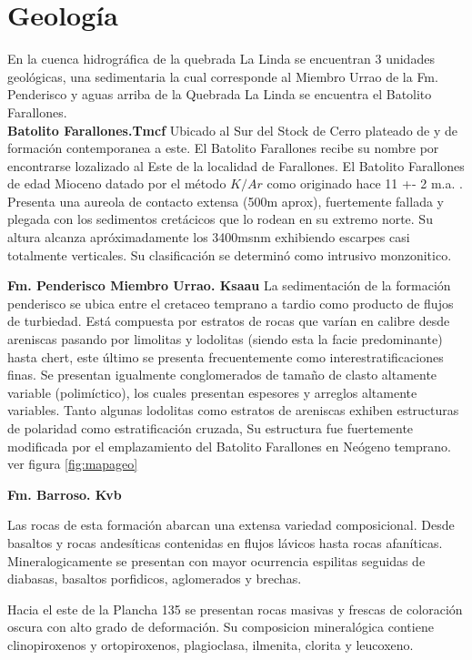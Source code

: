 \section{Geolog\'ia}
En la cuenca hidrogr\'afica de la quebrada La Linda se encuentran 3 unidades geol\'ogicas, una sedimentaria la cual corresponde al Miembro Urrao de la Fm. Penderisco y aguas arriba de la Quebrada La Linda se encuentra el Batolito Farallones.\\

\textbf{Batolito Farallones.Tmcf}
Ubicado al Sur del Stock de Cerro plateado de y de formaci\'on contemporanea a este. El Batolito Farallones recibe su nombre por encontrarse lozalizado al Este de la localidad de Farallones.
El Batolito Farallones de edad Mioceno datado por el m\'etodo $K/Ar$ como originado hace 11 +- 2 m.a. \cite{farallones}. Presenta una aureola de contacto extensa (500m aprox), fuertemente fallada y plegada con los sedimentos cret\'acicos que lo rodean en su extremo norte. Su altura alcanza apr\'oximadamente los 3400msnm exhibiendo escarpes casi totalmente verticales.
Su clasificaci\'on se determin\'o como intrusivo monzonitico.
 

\textbf{Fm. Penderisco Miembro Urrao. Ksaau}
La sedimentaci\'on de la formaci\'on penderisco se ubica entre el cretaceo temprano a tardio como producto de flujos de turbiedad.
Est\'a compuesta por estratos de rocas que var\'ian en calibre desde areniscas pasando por limolitas y lodolitas (siendo esta la facie predominante) hasta chert, este \'ultimo se presenta frecuentemente como interestratificaciones finas. Se presentan igualmente conglomerados de tama\~no de clasto altamente variable (polim\'ictico), los cuales presentan espesores y arreglos altamente variables.
Tanto algunas lodolitas como estratos de areniscas exhiben estructuras de polaridad como estratificaci\'on cruzada, 
Su estructura fue fuertemente modificada por el emplazamiento del Batolito Farallones en  Ne\'ogeno temprano. \cite{urrao}ver figura \ref{fig:mapageo}

\textbf{Fm. Barroso. Kvb}

Las rocas de esta formaci\'on abarcan una extensa variedad composicional. Desde basaltos y rocas andes\'iticas contenidas en flujos l\'avicos hasta rocas afan\'iticas. Mineralogicamente se presentan con mayor ocurrencia espilitas seguidas de diabasas, basaltos porfidicos, aglomerados y brechas.

Hacia el este de la Plancha 135 se presentan rocas masivas y frescas de coloraci\'on oscura con alto grado de deformaci\'on. Su composicion mineral\'ogica contiene clinopiroxenos y ortopiroxenos, plagioclasa, ilmenita, clorita y leucoxeno.

